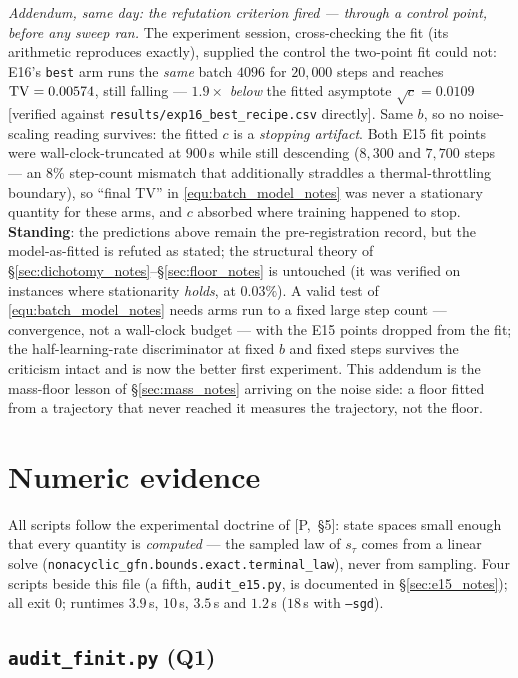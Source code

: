 \documentclass[11pt]{article}
\theoremstyle{definition}
\theoremstyle{remark}
\begin{document}
\emph{Addendum, same day: the refutation criterion fired --- through a control point,
before any sweep ran.} The experiment session, cross-checking the fit (its arithmetic
reproduces exactly), supplied the control the two-point fit could not: E16's
\texttt{best} arm runs the \emph{same} batch $4096$ for $20{,}000$ steps and reaches
$\mathrm{TV}=0.00574$, still falling --- $1.9\times$ \emph{below} the fitted asymptote
$\sqrt c=0.0109$ [verified against
\texttt{results/exp16\_best\_recipe.csv} directly]. Same $b$, so no noise-scaling
reading survives: the fitted $c$ is a \emph{stopping artifact}. Both E15 fit points were
wall-clock-truncated at $900$\,s while still descending ($8{,}300$ and $7{,}700$ steps
--- an $8\%$ step-count mismatch that additionally straddles a thermal-throttling
boundary), so ``final TV'' in \eqref{equ:batch_model_notes} was never a stationary quantity
for these arms, and $c$ absorbed where training happened to stop. \textbf{Standing}: the
predictions above remain the pre-registration record, but the model-as-fitted is refuted
as stated; the structural theory of \S\ref{sec:dichotomy_notes}--\S\ref{sec:floor_notes} is
untouched (it was verified on instances where stationarity \emph{holds}, at $0.03\%$).
A valid test of \eqref{equ:batch_model_notes} needs arms run to a fixed large step count ---
convergence, not a wall-clock budget --- with the E15 points dropped from the fit; the
half-learning-rate discriminator at fixed $b$ and fixed steps survives the criticism
intact and is now the better first experiment. This addendum is the mass-floor lesson of
\S\ref{sec:mass_notes} arriving on the noise side: a floor fitted from a trajectory that never
reached it measures the trajectory, not the floor.

\section{Numeric evidence}\label{sec:numerics_notes}

All scripts follow the experimental doctrine of [P,~\S5]: state spaces small enough that
every quantity is \emph{computed} --- the sampled law of $s_\tau$ comes from a linear
solve (\texttt{nonacyclic\_gfn.bounds.exact.terminal\_law}), never from sampling.
Four scripts beside this file (a fifth, \texttt{audit\_e15.py}, is documented in
\S\ref{sec:e15_notes}); all exit $0$; runtimes $3.9$\,s, $10$\,s, $3.5$\,s and $1.2$\,s
($18$\,s with \texttt{--sgd}).

\subsection{\texttt{audit\_finit.py} (Q1)}
\end{document}
